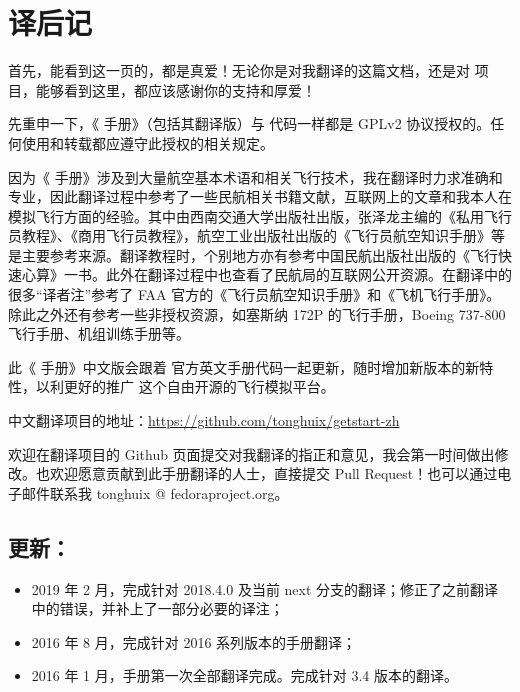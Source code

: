 \newpage
\section{译后记}

首先，能看到这一页的，都是真爱！无论你是对我翻译的这篇文档，还是对 \FlightGear{} 项目，能够看到这里，都应该感谢你的支持和厚爱！

先重申一下，《\FlightGear{} 手册》（包括其翻译版）与 \FligtGear{} 代码一样都是 GPLv2 协议授权的。任何使用和转载都应遵守此授权的相关规定。

因为《\FlightGear{} 手册》涉及到大量航空基本术语和相关飞行技术，我在翻译时力求准确和专业，因此翻译过程中参考了一些民航相关书籍文献，互联网上的文章和我本人在模拟飞行方面的经验。其中由西南交通大学出版社出版，张泽龙主编的《私用飞行员教程》、《商用飞行员教程》，航空工业出版社出版的《飞行员航空知识手册》等是主要参考来源。翻译教程时，个别地方亦有参考中国民航出版社出版的《飞行快速心算》一书。此外在翻译过程中也查看了民航局的互联网公开资源。在翻译中的很多“译者注”参考了 FAA 官方的《飞行员航空知识手册》和《飞机飞行手册》。除此之外还有参考一些非授权资源，如塞斯纳 172P 的飞行手册，Boeing 737-800 飞行手册、机组训练手册等。

此《\FlightGear{} 手册》中文版会跟着 \FlightGear{} 官方英文手册代码一起更新，随时增加新版本的新特性，以利更好的推广 \FlightGear{} 这个自由开源的飞行模拟平台。

中文翻译项目的地址：\url{https://github.com/tonghuix/getstart-zh}

欢迎在翻译项目的 Github 页面提交对我翻译的指正和意见，我会第一时间做出修改。也欢迎愿意贡献到此手册翻译的人士，直接提交 Pull Request！也可以通过电子邮件联系我 tonghuix @ fedoraproject.org。

\subsection*{更新：}
\begin{itemize}
\item 2019 年 2 月，完成针对 2018.4.0 及当前 next 分支的翻译；修正了之前翻译中的错误，并补上了一部分必要的译注；
\item 2016 年 8 月，完成针对 2016 系列版本的手册翻译；
\item 2016 年 1 月，手册第一次全部翻译完成。完成针对 3.4 版本的翻译。
\end{itemize}


